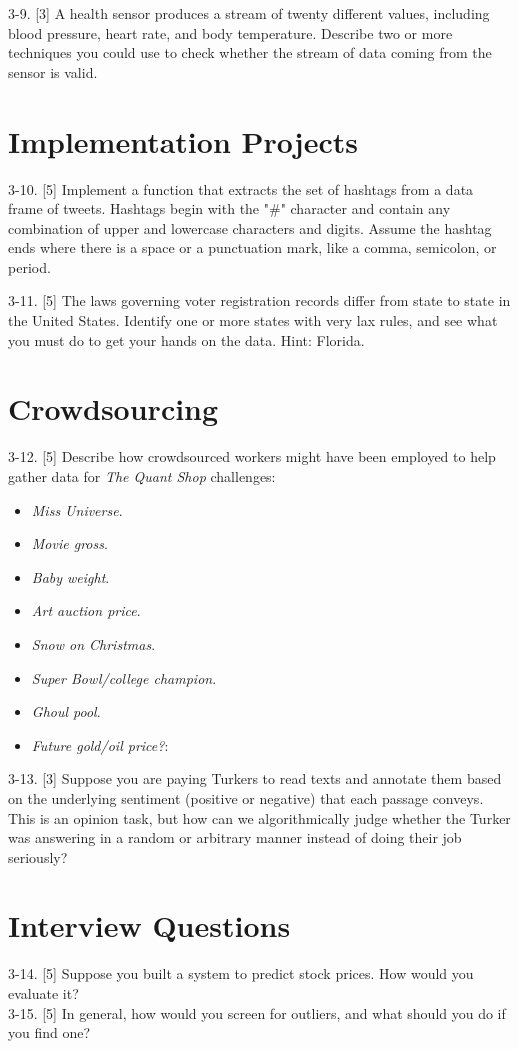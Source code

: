 \documentclass[10pt]{article}
\begin{document}
3-9. [3] A health sensor produces a stream of twenty different values, including blood pressure, heart rate, and body temperature. Describe two or more techniques you could use to check whether the stream of data coming from the sensor is valid.

\section*{Implementation Projects}
3-10. [5] Implement a function that extracts the set of hashtags from a data frame of tweets. Hashtags begin with the "\#" character and contain any combination of upper and lowercase characters and digits. Assume the hashtag ends where there is a space or a punctuation mark, like a comma, semicolon, or period.

3-11. [5] The laws governing voter registration records differ from state to state in the United States. Identify one or more states with very lax rules, and see what you must do to get your hands on the data. Hint: Florida.

\section*{Crowdsourcing}
3-12. [5] Describe how crowdsourced workers might have been employed to help gather data for \textit{The Quant Shop} challenges:

\begin{itemize}
  \item \textit{Miss Universe}.
  \item \textit{Movie gross}.
  \item \textit{Baby weight}.
  \item \textit{Art auction price}.
  \item \textit{Snow on Christmas}.
  \item \textit{Super Bowl/college champion}.
  \item \textit{Ghoul pool}.
  \item \textit{Future gold/oil price?}:
\end{itemize}

3-13. [3] Suppose you are paying Turkers to read texts and annotate them based on the underlying sentiment (positive or negative) that each passage conveys. This is an opinion task, but how can we algorithmically judge whether the Turker was answering in a random or arbitrary manner instead of doing their job seriously?

\section*{Interview Questions}
3-14. [5] Suppose you built a system to predict stock prices. How would you evaluate it?\\
3-15. [5] In general, how would you screen for outliers, and what should you do if you find one?
\end{document}
